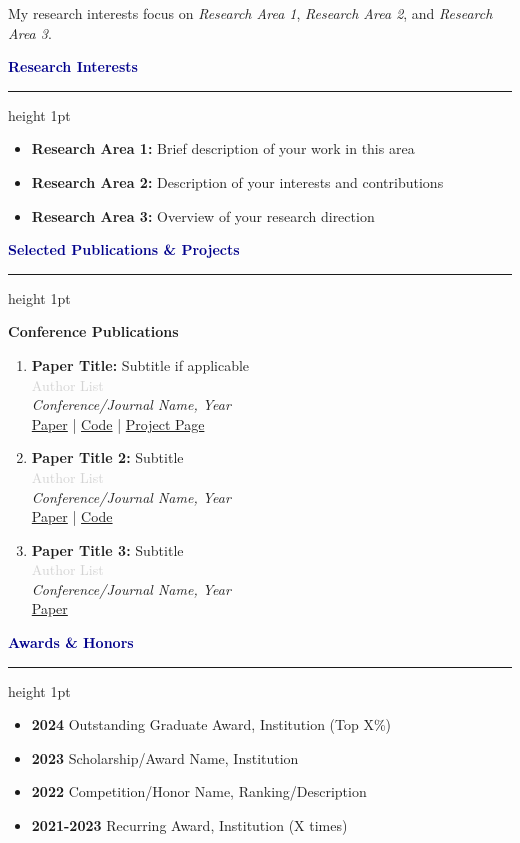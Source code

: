 \documentclass[11pt, a4paper]{article}
\newcommand{\sectioncolor}[1]{\textcolor{darkblue}{#1}}
\newcommand{\secondarycolor}[1]{\textcolor{lightgray}{#1}}
\newcommand{\cvsection}[1]{%
    \vspace{10pt}%
    {\Large\bfseries\sectioncolor{#1}}%
    \vspace{2pt}%
    \hrule height 1pt%
    \vspace{8pt}%
}
\begin{document}
My research interests focus on \textit{Research Area 1}, \textit{Research Area 2}, and \textit{Research Area 3}.

\cvsection{Research Interests}

\begin{itemize}[leftmargin=15pt, itemsep=4pt]
    \item \textbf{Research Area 1:} Brief description of your work in this area
    \item \textbf{Research Area 2:} Description of your interests and contributions
    \item \textbf{Research Area 3:} Overview of your research direction
\end{itemize}

\cvsection{Selected Publications \& Projects}

\textbf{Conference Publications}

\begin{enumerate}[leftmargin=15pt, itemsep=8pt]
    \item \textbf{Paper Title:} Subtitle if applicable \\
    \secondarycolor{Author List} \\
    \textit{Conference/Journal Name, Year} \\
    \href{https://paper-link.com}{Paper} | \href{https://github.com/username/repo}{Code} | \href{https://project-website.com}{Project Page}
    
    \item \textbf{Paper Title 2:} Subtitle \\
    \secondarycolor{Author List} \\
    \textit{Conference/Journal Name, Year} \\
    \href{https://paper-link.com}{Paper} | \href{https://github.com/username/repo}{Code}
    
    \item \textbf{Paper Title 3:} Subtitle \\
    \secondarycolor{Author List} \\
    \textit{Conference/Journal Name, Year} \\
    \href{https://paper-link.com}{Paper}
\end{enumerate}

\cvsection{Awards \& Honors}

\begin{itemize}[leftmargin=0pt, itemsep=6pt]
    \item \textbf{2024} Outstanding Graduate Award, Institution (Top X\%)
    \item \textbf{2023} Scholarship/Award Name, Institution
    \item \textbf{2022} Competition/Honor Name, Ranking/Description
    \item \textbf{2021-2023} Recurring Award, Institution (X times)
\end{itemize}
\end{document}
